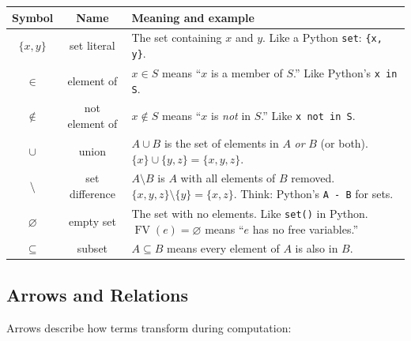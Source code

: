 \documentclass[11pt,a4paper]{article}
\theoremstyle{definition}
\newcommand{\FV}{\operatorname{FV}}
\begin{document}
\begin{center}
\renewcommand{\arraystretch}{1.6}
\begin{tabular}{ccp{8.5cm}}
\textbf{Symbol} & \textbf{Name} & \textbf{Meaning and example} \\
\hline
$\{x, y\}$ & set literal &
  The set containing $x$ and $y$. Like a Python \texttt{set}: \texttt{\{x, y\}}. \\

$\in$ & element of &
  $x \in S$ means ``$x$ is a member of $S$.'' Like Python's \texttt{x in S}. \\

$\notin$ & not element of &
  $x \notin S$ means ``$x$ is \emph{not} in $S$.'' Like \texttt{x not in S}. \\

$\cup$ & union &
  $A \cup B$ is the set of elements in $A$ \emph{or} $B$ (or both).
  $\{x\} \cup \{y,z\} = \{x,y,z\}$. \\

$\setminus$ & set difference &
  $A \setminus B$ is $A$ with all elements of $B$ removed.
  $\{x,y,z\} \setminus \{y\} = \{x,z\}$.
  Think: Python's \texttt{A - B} for sets. \\

$\varnothing$ & empty set &
  The set with no elements. Like \texttt{set()} in Python.
  $\FV(e) = \varnothing$ means ``$e$ has no free variables.'' \\

$\subseteq$ & subset &
  $A \subseteq B$ means every element of $A$ is also in $B$. \\
\end{tabular}
\end{center}

\subsection{Arrows and Relations}

Arrows describe how terms transform during computation:
\end{document}
